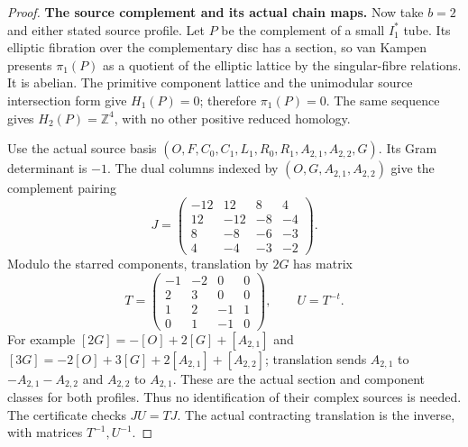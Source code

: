 \begin{proof}
\par\medskip\noindent\textbf{The source complement and its actual chain maps.}
Now take \(b=2\) and either stated source profile. Let \(P\)
be the complement of a small \(I_1^*\) tube. Its elliptic
fibration over the complementary disc has a section, so van Kampen
presents \(\pi_1(P)\) as a quotient of the elliptic lattice by
the singular-fibre relations. It is abelian. The primitive component
lattice and the unimodular source intersection form give
\(H_1(P)=0\); therefore \(\pi_1(P)=0\). The same sequence
gives \(H_2(P)=\mathbb Z^4\), with no other positive reduced
homology.

Use the actual source basis
\((O,F,C_0,C_1,L_1,R_0,R_1,A_{2,1},A_{2,2},G)\).
Its Gram determinant is \(-1\). The dual columns indexed by
\((O,G,A_{2,1},A_{2,2})\) give the complement pairing
\[
 J=\begin{pmatrix}
 -12&12&8&4\\12&-12&-8&-4\\8&-8&-6&-3\\4&-4&-3&-2
 \end{pmatrix}.
\]
Modulo the starred components, translation by \(2G\) has matrix
\[
 T=\begin{pmatrix}
 -1&-2&0&0\\2&3&0&0\\1&2&-1&1\\0&1&-1&0
 \end{pmatrix},\qquad U=T^{-t}.
                                                               \tag{P3F.36.5}
\]
For example \([2G]=-[O]+2[G]+[A_{2,1}]\) and
\([3G]=-2[O]+3[G]+2[A_{2,1}]+[A_{2,2}]\); translation sends
\(A_{2,1}\) to \(-A_{2,1}-A_{2,2}\) and \(A_{2,2}\)
to \(A_{2,1}\). These are the actual section and component
classes for both profiles. Thus no identification of their complex
sources is needed. The certificate checks \(JU=TJ\).
The actual contracting translation is the inverse, with matrices
\(T^{-1},U^{-1}\).


\end{proof}

